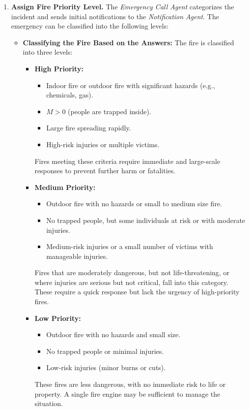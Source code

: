 \begin{enumerate}
    \item \textbf{Assign Fire Priority Level.} 
    The \textit{Emergency Call Agent} categorizes the incident and sends initial notifications 
    to the \textit{Notification Agent}. The emergency can be classified into the following levels:
    \begin{itemize}
        \item \textbf{Classifying the Fire Based on the Answers:}  
        The fire is classified into three levels:
        \begin{itemize}
            \item \textbf{High Priority:}
            \begin{itemize}
                \item Indoor fire or outdoor fire with significant hazards (e.g., chemicals, gas).
                \item $M > 0$ (people are trapped inside).
                \item Large fire spreading rapidly.
                \item High-risk injuries or multiple victims.
            \end{itemize}
            Fires meeting these criteria require immediate and large-scale responses to prevent further harm or fatalities.
            
            \item \textbf{Medium Priority:}
            \begin{itemize}
                \item Outdoor fire with no hazards or small to medium size fire.
                \item No trapped people, but some individuals at risk or with moderate injuries.
                \item Medium-risk injuries or a small number of victims with manageable injuries.
            \end{itemize}
            Fires that are moderately dangerous, but not life-threatening, or where injuries are serious but not critical, 
            fall into this category. These require a quick response but lack the urgency of high-priority fires.
            
            \item \textbf{Low Priority:}
            \begin{itemize}
                \item Outdoor fire with no hazards and small size.
                \item No trapped people or minimal injuries.
                \item Low-risk injuries (minor burns or cuts).
            \end{itemize}
            These fires are less dangerous, with no immediate risk to life or property. A single fire engine may be sufficient to manage the situation.
        \end{itemize}
    \end{itemize}


\end{enumerate}
